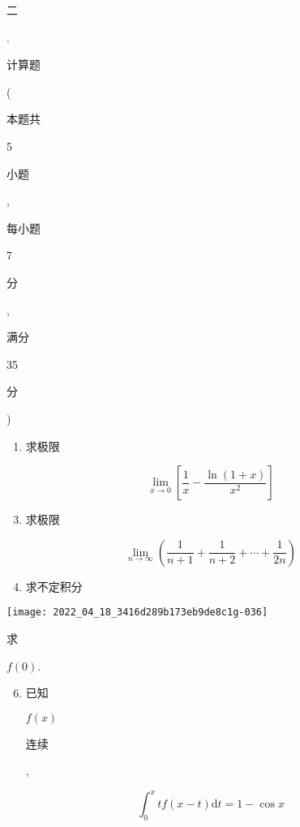 \documentclass[10pt]{article}
\begin{document}
\begin{CJK}{UTF8}{mj}二\end{CJK}. \begin{CJK}{UTF8}{mj}计算题\end{CJK} (\begin{CJK}{UTF8}{mj}本题共\end{CJK} 5 \begin{CJK}{UTF8}{mj}小题\end{CJK}, \begin{CJK}{UTF8}{mj}每小题\end{CJK} 7 \begin{CJK}{UTF8}{mj}分\end{CJK}, \begin{CJK}{UTF8}{mj}满分\end{CJK} 35 \begin{CJK}{UTF8}{mj}分\end{CJK})

\begin{enumerate}
  \item \begin{CJK}{UTF8}{mj}求极限\end{CJK}
\end{enumerate}
$$
\lim _{x \rightarrow 0}\left[\frac{1}{x}-\frac{\ln (1+x)}{x^{2}}\right]
$$

\begin{enumerate}
  \setcounter{enumi}{2}
  \item \begin{CJK}{UTF8}{mj}求极限\end{CJK}
\end{enumerate}
$$
\lim _{n \rightarrow \infty}\left(\frac{1}{n+1}+\frac{1}{n+2}+\cdots+\frac{1}{2 n}\right)
$$

\begin{enumerate}
  \setcounter{enumi}{3}
  \item \begin{CJK}{UTF8}{mj}求不定积分\end{CJK}
\end{enumerate}
\texttt{[image: 2022\_04\_18\_3416d289b173eb9de8c1g-036]}

\begin{CJK}{UTF8}{mj}求\end{CJK} $f(0)$.

\begin{enumerate}
  \setcounter{enumi}{5}
  \item \begin{CJK}{UTF8}{mj}已知\end{CJK} $f(x)$ \begin{CJK}{UTF8}{mj}连续\end{CJK},
\end{enumerate}
$$
\int_{0}^{x} t f(x-t) \mathrm{d} t=1-\cos x
$$
\end{document}
